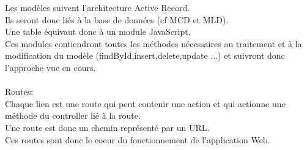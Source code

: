Les modèles suivent l'architecture Active Record. \\
Ils seront donc liés à la base de données (cf MCD et MLD). \\
Une table équivaut donc à un module JavaScript. \\
Ces modules contiendront toutes les méthodes nécessaires au traitement et à la modification du modèle (findById,insert,delete,update ...) et suivront donc l'approche vue en cours. \\
\\

Routes: \\
Chaque lien est une route qui peut contenir une action et qui actionne une méthode du controller lié à la route. \\
Une route est donc un chemin représenté par un URL. \\
Ces routes sont donc le coeur du fonctionnement de l'application Web.\\

